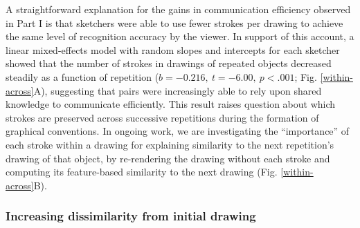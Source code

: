 \documentclass[10pt,letterpaper]{article}
\newcommand{\jefan}[1]{\textcolor{Blue}{jefan: #1}}
\begin{document}
A straightforward explanation for the gains in communication efficiency observed in Part I is that sketchers were able to use fewer strokes per drawing to achieve the same level of recognition accuracy by the viewer.
In support of this account, a linear mixed-effects model with random slopes and intercepts for each sketcher showed that the number of strokes in drawings of repeated objects decreased steadily as a function of repetition ($b = -0.216, ~t = -6.00, ~p < .001$; Fig. \ref{within-across}A), suggesting that pairs were increasingly able to rely upon shared knowledge to communicate efficiently. 
This result raises question about which strokes are preserved across successive repetitions during the formation of graphical conventions. 
In ongoing work, we are investigating the ``importance'' of each stroke within a drawing for explaining similarity to the next repetition's drawing of that object, by re-rendering the drawing without each stroke and computing its feature-based similarity to the next drawing (Fig. \ref{within-across}B). 






\subsubsection{Increasing dissimilarity from initial drawing}
\end{document}

